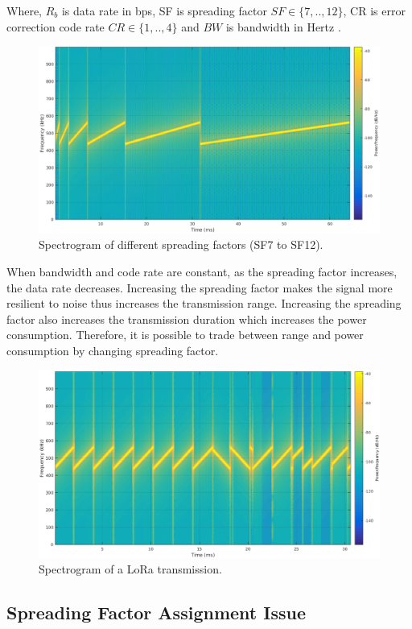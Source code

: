 Where, $R_{b}$ is data rate in bps, SF is spreading factor $SF \in \{7,..,12\}$, CR is error correction code rate $CR \in \{1,..,4\}$ and $BW$ is bandwidth in Hertz \cite{AN1200.22}.

\begin{figure}
\centering
\includegraphics[width=.7\linewidth]{fig/lora_sf_comparasion.png}
\vspace*{4mm}
\caption{Spectrogram of different spreading factors (SF7 to SF12). \cite{sghoslya_lora}}
\label{fig:lora_sf_comparasion}
\end{figure}

When bandwidth and code rate are constant, as the spreading factor increases, the data rate decreases. Increasing the spreading factor makes the signal more resilient to noise thus increases the transmission range. Increasing the spreading factor also increases the transmission duration which increases the power consumption. Therefore, it is possible to trade between range and power consumption by changing spreading factor.

\begin{figure}
\centering
\includegraphics[width=.7\linewidth]{fig/lora_symbols.png}
\vspace*{4mm}
\caption{Spectrogram of a LoRa transmission. \cite{sghoslya_lora}}
\label{fig:lora_symbols}
\end{figure}

\subsection{Spreading Factor Assignment Issue}


